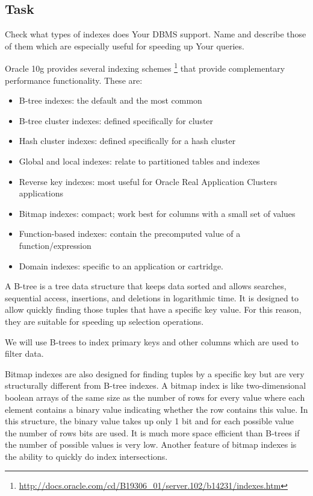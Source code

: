 \subsection*{Task} 
Check what types of indexes does Your DBMS support. Name and describe those of them which are especially useful for speeding up Your
queries.

Oracle 10g provides several indexing schemes
\footnote{\url{http://docs.oracle.com/cd/B19306_01/server.102/b14231/indexes.htm}}
that provide complementary performance functionality. These are:
\begin{itemize}
\item B-tree indexes: the default and the most common
\item B-tree cluster indexes: defined specifically for cluster
\item Hash cluster indexes: defined specifically for a hash cluster
\item Global and local indexes: relate to partitioned tables and indexes
\item Reverse key indexes: most useful for Oracle Real Application Clusters applications
\item Bitmap indexes: compact; work best for columns with a small set of values
\item Function-based indexes: contain the precomputed value of a function/expression
\item Domain indexes: specific to an application or cartridge.
\end{itemize}

A B-tree is a tree data structure that keeps data sorted and allows searches, sequential access, insertions, and deletions in logarithmic time. It is designed to allow quickly finding those tuples that have a specific key value. For this reason, they are suitable for speeding up selection operations. 

We will use B-trees to index primary keys and other columns which are used to filter data.

Bitmap indexes are also designed for finding tuples by a specific key but are very structurally different from B-tree indexes. A bitmap index is like two-dimensional boolean arrays of the same size as the number of rows for every value where each element contains a binary value indicating whether the row contains this value. In this structure, the binary value takes up only 1 bit and for each possible value the number of rows bits are used. It is much more space efficient than B-trees if the number of possible values is very low. Another feature of bitmap indexes is the ability to quickly do index intersections.

